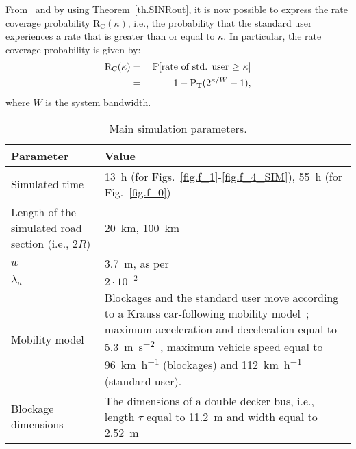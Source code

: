 \documentclass[10pt,journal,a4paper]{IEEEtran}
\begin{document}
From~\cite[Theorem 1]{6497002} and by using Theorem~\ref{th.SINRout}, it is now possible to express the rate coverage probability $\mathrm{R}_\mathrm{C}(\kappa)$, i.e., the probability that the standard user experiences a rate that is greater than or equal to $\kappa$. In particular, the rate coverage probability is given by:
\setlength{\arraycolsep}{0.0em} 
\begin{eqnarray}
\mathrm{R}_\mathrm{C}(\kappa) &{}={}& \mathbb{P}[\text{rate of std. user $\geq$ $\kappa$}]\notag\\
&{}={}& 1 - \mathrm{P}_\mathrm{T}(2^{\kappa/W}-1),\label{eq.rate}
\end{eqnarray}
where $W$ is the system bandwidth.

\begin{table}[t]
\centering
\caption{Main simulation parameters.}
\label{tab.sim}
{\scriptsize
\begin{tabular}{|P{2cm}|P{5.8cm}|}
\hline \textbf{Parameter}  & \textbf{Value}\\
\hline \vspace{-2mm}Simulated time & \vspace{-2mm}\SI{13}{\hour} (for Figs.~\ref{fig.f_1}-\ref{fig.f_4_SIM}), \SI{55}{\hour} (for Fig.~\ref{fig.f_0})\\
\hline Length of the simulated road section (i.e., $2R$) & \vspace{1mm}\SI{20}{\kilo\meter}, \SI{100}{\kilo\meter}\\
\hline $w$ & \SI{3.7}{\meter}, as per~\cite{ioannou2013automated}\\
\hline \vspace{-1.6mm}$\lambda_u$ & \vspace{-1.6mm}$2 \cdot 10^{-2}$\\
\hline \vspace{-2mm}Mobility model & \vspace{-2mm}Blockages and the standard user move according to a Krauss car-following mobility model~\cite{Kanagaraj2013390}; maximum acceleration and deceleration equal to \SI{5.3}{\meter\per\second^2}~\cite{fambro1997determination}, maximum vehicle speed equal to \SI{96}{\kilo\meter\per\hour} (blockages) and \SI{112}{\kilo\meter\per\hour} (standard user). \\
\hline \vspace{-2mm}Blockage dimensions & \vspace{-2mm}The dimensions of a double decker bus, i.e.,  length $\tau$ equal to \SI{11.2}{\meter} and width equal to \SI{2.52}{\meter}~\cite{routermaster}\\

\end{tabular}}
\end{table}
\end{document}
